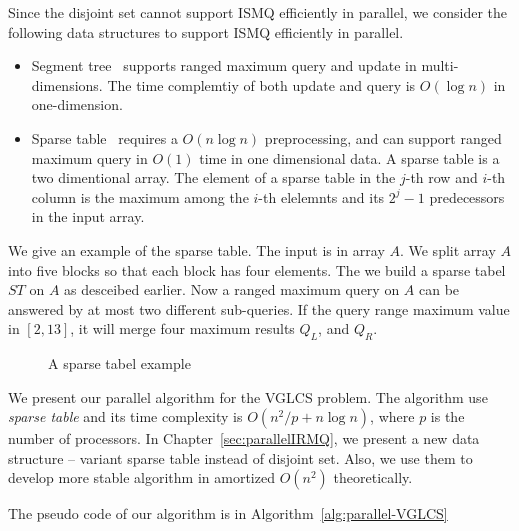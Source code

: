 Since the disjoint set cannot support ISMQ efficiently in parallel, we
consider the following data structures to support ISMQ efficiently in
parallel.

\begin{itemize}
  \item Segment tree~\cite{berg2000computational} supports ranged
    maximum query and update in multi-dimensions.  The time complemtiy
    of both update and query is $O(\log n)$ in one-dimension.
  \item Sparse table~\cite{Berkman1993RecursiveSP} requires a $O(n
    \log n)$ preprocessing, and can support ranged maximum query in
    $O(1)$ time in one dimensional data.  A sparse table is a two
    dimentional array.  The element of a sparse table in the $j$-th
    row and $i$-th column is the maximum among the $i$-th elelemnts
    and its $2^j - 1$ predecessors in the input array.
\end{itemize}

We give an example of the sparse table.  The input is in array $A$. We
split array $A$ into five blocks so that each block has four elements.
The we build a sparse tabel $ST$ on $A$ as desceibed earlier.  Now a
ranged maximum query on $A$ can be answered by at most two different
sub-queries.  If the query range maximum value in $[2, 13]$, it will
merge four maximum results $Q_L$, and $Q_R$.
    
\begin{figure}[!thb]
  \centering {} 
  \caption{A sparse tabel example}
  \label{fig:interval-decomposition}
\end{figure}

We present our parallel algorithm for the VGLCS problem.  The algorithm
use {\em sparse table} and its time complexity is $O(n^2 / p + n \log
n)$, where $p$ is the number of processors.  In
Chapter~\ref{sec:parallelIRMQ}, we present a new data structure --
variant sparse table instead of disjoint set.  Also, we use them to
develop more stable algorithm in amortized $O(n^2)$ theoretically.


The pseudo code of our algorithm is in 
Algorithm~\ref{alg:parallel-VGLCS}

\iffalse 稀疏表是我們認為最好的替代方案，其整合後為 VGLCS 平行算法
\ref{alg:parallel-VGLCS}，算法的時間複雜度為 $O(n^2 / p + n \log n)$，
其中 $p$ 為處理器個數。在後續的章節，我們將提出新的數據結構取代并查集操
作，且能在平行算法達到理想複雜度 $O(n^2 / p + n \log n)$。\fi


